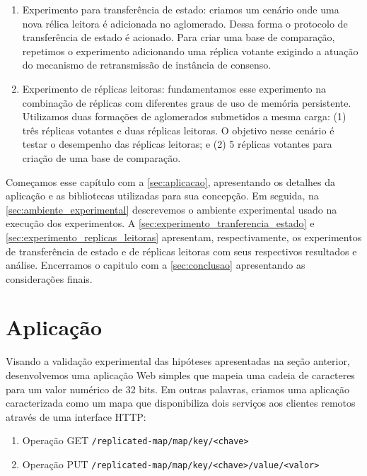 \begin{enumerate}
  \item Experimento para transferência de estado: criamos um cenário onde uma nova rélica
    leitora é adicionada no aglomerado. Dessa forma o protocolo de transferência de estado
    é acionado. Para criar uma base de comparação, repetimos o experimento adicionando uma
    réplica votante exigindo a atuação do mecanismo de retransmissão de instância de
    consenso.
  \item Experimento de réplicas leitoras: fundamentamos esse experimento na combinação de
    réplicas com diferentes graus de uso de memória persistente. Utilizamos duas formações
    de aglomerados submetidos a mesma carga: (1) três réplicas votantes e duas réplicas
    leitoras. O objetivo nesse cenário é testar o desempenho das réplicas leitoras; e (2)
    5 réplicas votantes para criação de uma base de comparação.
\end{enumerate}

Começamos esse capítulo com a \autoref{sec:aplicacao}, apresentando os detalhes da
aplicação e as bibliotecas utilizadas para sua concepção. Em seguida, na
\autoref{sec:ambiente_experimental} descrevemos o ambiente experimental usado na execução
dos experimentos. A \autoref{sec:experimento_tranferencia_estado} e
\autoref{sec:experimento_replicas_leitoras} apresentam, respectivamente, os experimentos de
transferência de estado e de réplicas leitoras com seus respectivos resultados e análise.
Encerramos o capitulo com a \autoref{sec:conclusao} apresentando as considerações finais.


\section{Aplicação}\label{sec:aplicacao}

Visando a validação experimental das hipóteses apresentadas na seção anterior,
desenvolvemos uma aplicação Web simples que mapeia uma cadeia de caracteres para um valor
numérico de 32 bits. Em outras palavras, criamos uma aplicação caracterizada como um mapa
que disponibiliza dois serviços aos clientes remotos através de uma interface HTTP:

\begin{enumerate}
  \item Operação GET \verb|/replicated-map/map/key/<chave>|
  \item Operação PUT \verb|/replicated-map/map/key/<chave>/value/<valor>|
\end{enumerate}

